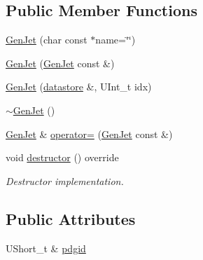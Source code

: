 \subsection*{Public Member Functions}
\begin{DoxyCompactItemize}
\item 
\hyperlink{classpanda_1_1GenJet_aca195391522e9b5e1541ba22f3dedb6e}{GenJet} (char const $\ast$name=\char`\"{}\char`\"{})
\item 
\hyperlink{classpanda_1_1GenJet_a2061e0c00ed8d4f404e70156120fd9c0}{GenJet} (\hyperlink{classpanda_1_1GenJet}{GenJet} const \&)
\item 
\hyperlink{classpanda_1_1GenJet_a3e47a5f2cb37c4377bee43b689f2bc60}{GenJet} (\hyperlink{structpanda_1_1Element_1_1datastore}{datastore} \&, UInt\_\-t idx)
\item 
\hyperlink{classpanda_1_1GenJet_ab92fb5378518bad26b16e55697e099c5}{$\sim$GenJet} ()
\item 
\hyperlink{classpanda_1_1GenJet}{GenJet} \& \hyperlink{classpanda_1_1GenJet_aeaa1c9ce79a2ac5e7d49ff5ea1e34136}{operator=} (\hyperlink{classpanda_1_1GenJet}{GenJet} const \&)
\item 
void \hyperlink{classpanda_1_1GenJet_a4a10379464d97681df56ba78c59d9ec9}{destructor} () override
\begin{DoxyCompactList}\small\item\em Destructor implementation. \item\end{DoxyCompactList}\end{DoxyCompactItemize}
\subsection*{Public Attributes}
\begin{DoxyCompactItemize}
\item 
UShort\_\-t \& \hyperlink{classpanda_1_1GenJet_a6b39b34d6884f77520bab3129aa1c3b3}{pdgid}
\end{DoxyCompactItemize}
